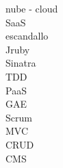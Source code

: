 
nube - cloud \\
SaaS \\
escandallo \\
Jruby \\
Sinatra \\
TDD \\
PaaS \\
GAE \\
Scrum \\
MVC \\
CRUD \\
CMS \\